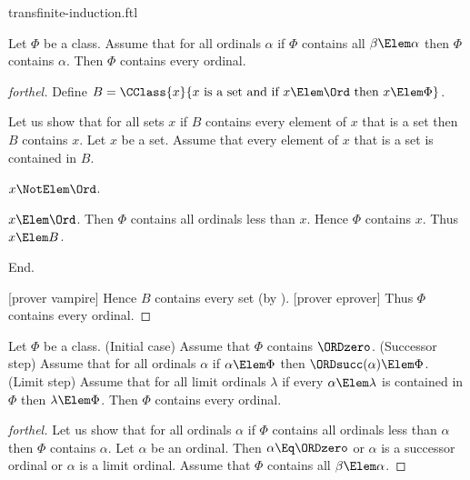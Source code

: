 \documentclass{stex}
\begin{document}
\begin{smodule}{transfinite-induction.ftl}


\begin{theorem}[forthel,title=Transfinite Induction I,name=transfinite induction I]
  Let $\Phi$ be a class.
  Assume that for all ordinals $\alpha$ if $\Phi$ contains all $\beta \Elem \alpha$ then $\Phi$ contains $\alpha$.
  Then $\Phi$ contains every ordinal.
\end{theorem}
\begin{proof}[forthel]
  Define $B = \CClass{x}{x\text{ is a set and if }x \Elem \Ord\text{ then }x \Elem \Phi}$.

  Let us show that for all sets $x$ if $B$ contains every element of $x$ that is a set then $B$ contains $x$.
    Let $x$ be a set.
    Assume that every element of $x$ that is a set is contained in $B$.

    \begin{case}{$x \NotElem \Ord$.} \end{case}

    \begin{case}{$x \Elem \Ord$.}
      Then $\Phi$ contains all ordinals less than $x$.
      Hence $\Phi$ contains $x$.
      Thus $x \Elem B$.
    \end{case}
  End.

  [prover vampire]
  Hence $B$ contains every set (by ).
  [prover eprover]
  Thus $\Phi$ contains every ordinal.
\end{proof}

\begin{theorem}[forthel,title=Transfinite Induction II,name=transfinite induction II]
  Let $\Phi$ be a class.
  (Initial case) Assume that $\Phi$ contains $\ORDzero$.
  (Successor step) Assume that for all ordinals $\alpha$ if $\alpha \Elem \Phi$ then $\ORDsucc(\alpha) \Elem \Phi$.
  (Limit step) Assume that for all limit ordinals $\lambda$ if every $\alpha \Elem \lambda$ is contained in $\Phi$ then $\lambda \Elem \Phi$.
  Then $\Phi$ contains every ordinal.
\end{theorem}
\begin{proof}[forthel]
  Let us show that for all ordinals $\alpha$ if $\Phi$ contains all ordinals
  less than $\alpha$ then $\Phi$ contains $\alpha$.
    Let $\alpha$ be an ordinal.
    Then $\alpha \Eq \ORDzero$ or $\alpha$ is a successor ordinal or $\alpha$ is a
    limit ordinal.
    Assume that $\Phi$ contains all $\beta \Elem \alpha$.


\end{proof}
\end{smodule}
\end{document}

